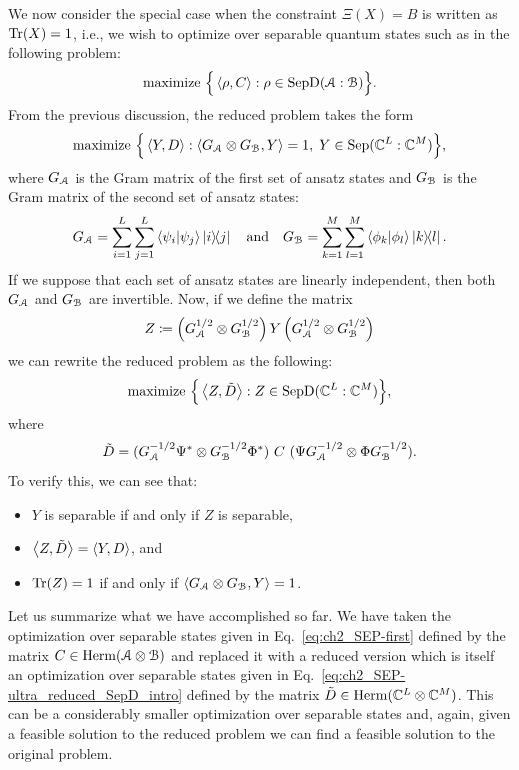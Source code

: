 We now consider the special case when the constraint $\Xi(X) = B$ is written as $\Tr(X) = 1$, i.e., we wish to optimize over separable quantum states such as in the following problem:  
\begin{equation} \label{eq:ch2_SEP-first}
    \text{maximize } \Big\{ \left\langle \rho, C \right\rangle : \rho \in \mathrm{SepD}(\mathcal{A}:\mathcal{B}) \Big\}.
\end{equation} 
From the previous discussion, the reduced problem takes the form 
\begin{equation}
    \label{eq:ch2_SEP-reduced_SepD_intro}
    \text{maximize } \Big\{ \left\langle Y, D \right\rangle : \left\langle G_{\mathcal{A}} \otimes G_{\mathcal{B}}, Y \right\rangle = 1, \; Y \in \mathrm{Sep}(\mathbb{C}^L : \mathbb{C}^M) \Big\},
\end{equation}
where $G_{\mathcal{A}}$ is the Gram matrix of the first set of ansatz states and $G_{\mathcal{B}}$ is the Gram matrix of the second set of ansatz states: 
\begin{equation}
    G_{\mathcal{A}} = \sum_{i=1}^L \sum_{j=1}^L \braket{\psi_i}{\psi_j} \ketbra{i}{j} \quad \text{and} \quad G_{\mathcal{B}} = \sum_{k=1}^M \sum_{l=1}^M \braket{\phi_k}{\phi_l} \ketbra{k}{l}. 
\end{equation} 
If we suppose that each set of ansatz states are linearly independent, then both $G_{\mathcal{A}}$ and $G_{\mathcal{B}}$ are invertible. 
Now, if we define the matrix 
\begin{equation}
    Z \coloneqq \left( G_{\mathcal{A}}^{1/2} \otimes G_{\mathcal{B}}^{1/2} \right) Y \left( G_{\mathcal{A}}^{1/2} \otimes G_{\mathcal{B}}^{1/2} \right) 
\end{equation}
we can rewrite the reduced problem as the following: 
\begin{equation}
    \label{eq:ch2_SEP-ultra_reduced_SepD_intro}
    \text{maximize } \Big\{ \left\langle Z, \tilde{D} \right\rangle : Z \in \mathrm{SepD}(\mathbb{C}^L : \mathbb{C}^M) \Big\},
\end{equation}
where 
\begin{equation} \label{eq:ch2-SEP_Dyo}
\tilde{D} = (G_{\mathcal{A}}^{-1/2} \Psi^* \otimes G_{\mathcal{B}}^{-1/2}\Phi^*)\ C\ (\Psi G_{\mathcal{A}}^{-1/2} \otimes \Phi G_{\mathcal{B}}^{-1/2}). 
\end{equation} 
To verify this, we can see that: 
\begin{itemize} 
\item $Y$ is separable if and only if $Z$ is separable, 
\item $\left\langle Z, \tilde{D} \right\rangle = \left\langle Y, D \right\rangle$, and 
\item $\Tr(Z) = 1$ if and only if $\left\langle G_{\mathcal{A}} \otimes G_{\mathcal{B}}, Y \right\rangle = 1$. 
\end{itemize} 

Let us summarize what we have accomplished so far. 
We have taken the optimization over separable states given in Eq.~\eqref{eq:ch2_SEP-first} defined by the matrix $C \in \operatorname{Herm}(\mathcal{A} \otimes \mathcal{B})$ and replaced it with a reduced version which is itself an optimization over separable states given in Eq.~\eqref{eq:ch2_SEP-ultra_reduced_SepD_intro} defined by the matrix $\tilde{D} \in \operatorname{Herm}(\mathbb{C}^L \otimes \mathbb{C}^M)$.  
This can be a considerably smaller optimization over separable states and, again, given a feasible solution to the reduced problem we can find a feasible solution to the original problem. 

